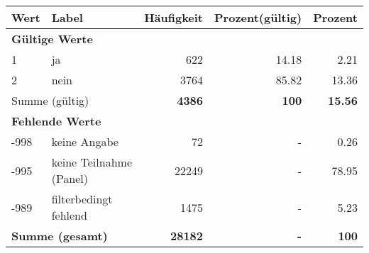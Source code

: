      \begin{longtable}{lXrrr}
     \toprule
     \textbf{Wert} & \textbf{Label} & \textbf{Häufigkeit} & \textbf{Prozent(gültig)} & \textbf{Prozent} \\
     \endhead
     \midrule
     \multicolumn{5}{l}{\textbf{Gültige Werte}}\\

     1 &
     \multicolumn{1}{X}{ ja   } &


       \num{622} &
       \num[round-mode=places,round-precision=2]{14.18} &
         \num[round-mode=places,round-precision=2]{2.21} \\

     2 &
     \multicolumn{1}{X}{ nein   } &


       \num{3764} &
       \num[round-mode=places,round-precision=2]{85.82} &
         \num[round-mode=places,round-precision=2]{13.36} \\
     \midrule
     \multicolumn{2}{l}{Summe (gültig)} &
       \textbf{\num{4386}} &
     \textbf{\num{100}} &
       \textbf{\num[round-mode=places,round-precision=2]{15.56}} \\
     \multicolumn{5}{l}{\textbf{Fehlende Werte}}\\
       -998 &
       keine Angabe &
         \num{72} &
        - &
         \num[round-mode=places,round-precision=2]{0.26} \\
       -995 &
       keine Teilnahme (Panel) &
         \num{22249} &
        - &
         \num[round-mode=places,round-precision=2]{78.95} \\
       -989 &
       filterbedingt fehlend &
         \num{1475} &
        - &
         \num[round-mode=places,round-precision=2]{5.23} \\
     \midrule
     \multicolumn{2}{l}{\textbf{Summe (gesamt)}} &
          \textbf{\num{28182}} &
        \textbf{-} &
        \textbf{\num{100}} \\
     \bottomrule
     \end{longtable}
     
